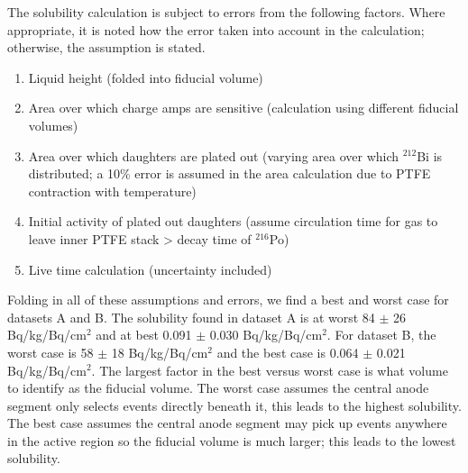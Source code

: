 \begin{table}[ht]
\begin{tabular}{lcc}
\\[-5pt]

\\[-5pt]

\hline
\end{tabular}
\label{T:solubility}
\end{table}


The solubility calculation is subject to errors from the following factors. Where appropriate, it is noted how the error taken into account in the calculation; otherwise, the assumption is stated.
\begin{enumerate}
\item Liquid height (folded into fiducial volume)
\item Area over which charge amps are sensitive (calculation using different fiducial volumes)
\item Area over which daughters are plated out (varying area over which $^{212}$Bi is distributed; a 10\% error is assumed in the area calculation due to \ac{PTFE} contraction with temperature)
\item Initial activity of plated out daughters (assume circulation time for gas to leave inner PTFE stack > decay time of $^{216}$Po)
\item Live time calculation (uncertainty included)
\end{enumerate}

Folding in all of these assumptions and errors, we find a best and worst case for datasets A and B. The solubility found in dataset A is at worst 84 $\pm$ 26 Bq/kg/Bq/cm$^{2}$ and at best 0.091 $\pm$ 0.030 Bq/kg/Bq/cm$^{2}$. For dataset B, the worst case is 58 $\pm$ 18 Bq/kg/Bq/cm$^{2}$ and the best case is 0.064 $\pm$ 0.021 Bq/kg/Bq/cm$^{2}$. The largest factor in the best versus worst case is what volume to identify as the fiducial volume. The worst case assumes the central anode segment only selects events directly beneath it, this leads to the highest solubility. The best case assumes the central anode segment may pick up events anywhere in the active region so the fiducial volume is much larger; this leads to the lowest solubility.

